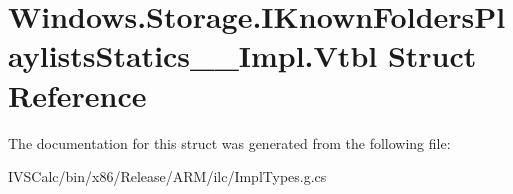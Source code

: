 \hypertarget{struct_windows_1_1_storage_1_1_i_known_folders_playlists_statics_____impl_1_1_vtbl}{}\section{Windows.\+Storage.\+I\+Known\+Folders\+Playlists\+Statics\+\_\+\+\_\+\+Impl.\+Vtbl Struct Reference}
\label{struct_windows_1_1_storage_1_1_i_known_folders_playlists_statics_____impl_1_1_vtbl}


The documentation for this struct was generated from the following file\+:\begin{DoxyCompactItemize}
\item 
I\+V\+S\+Calc/bin/x86/\+Release/\+A\+R\+M/ilc/Impl\+Types.\+g.\+cs\end{DoxyCompactItemize}

